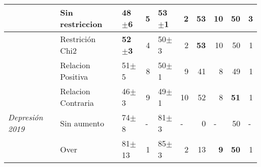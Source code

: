 \begin{table}[h]
\begin{center}
{\begin{tabular}{lllrlrrrrr}
                           & \cellcolor[HTML]{EFEFEF}Sin restriccion & \cellcolor[HTML]{EFEFEF}48$\pm$6          & \cellcolor[HTML]{EFEFEF}5                     & \cellcolor[HTML]{EFEFEF}\textbf{53$\pm$1} & \cellcolor[HTML]{EFEFEF}2                     & \cellcolor[HTML]{EFEFEF}\textbf{53} & \cellcolor[HTML]{EFEFEF}10                    & \cellcolor[HTML]{EFEFEF}50          & \cellcolor[HTML]{EFEFEF}3                     \\ \hline
                           & Restrición Chi2                         & \textbf{52$\pm$3}                         & 4                                             & 50$\pm$3                                  & 2                                             & \textbf{53}                         & 10                                            & 50                                  & 1                                             \\ \hline
                           & Relacion Positiva                       & 51$\pm$5                                  & 8                                             & 50$\pm$1                                  & 9                                             & 41                                  & 8                                             & 49                                  & 1                                             \\ \hline
                           & Relacion Contraria                      & 46$\pm$3                                  & 9                                             & 49$\pm$1                                  & 10                                            & 52                                  & 8                                             & \textbf{51}                         & 1                                             \\ \hline
\textit{Depresión 2019}    & \cellcolor[HTML]{C0C0C0}Sin aumento     & \cellcolor[HTML]{C0C0C0}74$\pm$8          & \multicolumn{1}{l}{\cellcolor[HTML]{C0C0C0}-} & \cellcolor[HTML]{C0C0C0}81$\pm$3          & \multicolumn{1}{l}{\cellcolor[HTML]{C0C0C0}-} & \cellcolor[HTML]{C0C0C0}0           & \multicolumn{1}{l}{\cellcolor[HTML]{C0C0C0}-} & \cellcolor[HTML]{C0C0C0}50          & \multicolumn{1}{l}{\cellcolor[HTML]{C0C0C0}-} \\ \hline
                           & \cellcolor[HTML]{EFEFEF}Over            & \cellcolor[HTML]{EFEFEF}81$\pm$13         & \cellcolor[HTML]{EFEFEF}1                     & \cellcolor[HTML]{EFEFEF}85$\pm$3          & \cellcolor[HTML]{EFEFEF}2                     & \cellcolor[HTML]{EFEFEF}13          & \cellcolor[HTML]{EFEFEF}\textbf{9}            & \cellcolor[HTML]{EFEFEF}\textbf{50} & \cellcolor[HTML]{EFEFEF}1                     \\ \hline

\end{tabular}}
\end{center}
\end{table}
